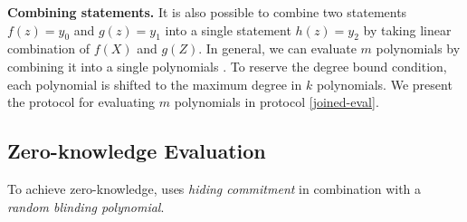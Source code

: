 \textbf{Combining statements.} It is also possible to combine two statements $f(z) = y_0$ and $g(z) = y_1$ into a single statement $h(z) = y_2$ by taking linear combination of $f(X)$ and $g(Z)$. In general, we can evaluate $m$ polynomials by combining it into a single polynomials \cite{bunz2020transparent}. To reserve the degree bound condition, each polynomial is shifted to the maximum degree in $k$ polynomials. We present the protocol for evaluating $m$ polynomials in protocol \ref{joined-eval}.

\subsection{Zero-knowledge Evaluation}

To achieve zero-knowledge, \cite{bunz2020transparent} uses \textit{hiding commitment} in combination with a \textit{random blinding polynomial}.

